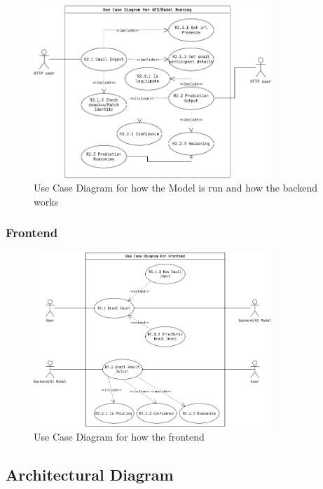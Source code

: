 \documentclass[a4paper,10pt]{article}
\begin{document}
\begin{figure}[ht!]
	\centering
	\includegraphics[width=0.8\textwidth]{doc-img/UC-Run-Model.drawio.png}
	\caption{Use Case Diagram for how the Model is run and how the backend works}
	\label{fig:uc-run-model}
\end{figure}

\pagebreak
\subsubsection{Frontend}


\begin{figure}[ht!]
	\centering
	\includegraphics[width=0.8\textwidth]{doc-img/UC-Frontend.drawio.png}
	\caption{Use Case Diagram for how the frontend}
	\label{fig:uc-frontend}
\end{figure}

\subsection{Architectural Diagram}
\end{document}
